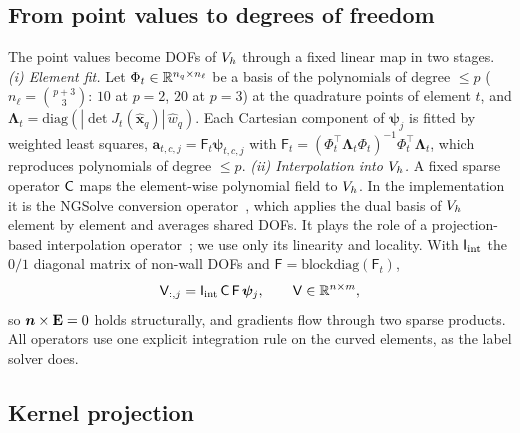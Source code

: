 \subsection{From point values to degrees of freedom}\label{sec:04-map}

The point values become DOFs of $V_h$ through a fixed linear map in two stages.
\emph{(i) Element fit.}
Let $\Phi_t\in\mathbb{R}^{n_q\times n_\ell}$ be a basis of the polynomials of degree $\le p$ ($n_\ell=\binom{p+3}{3}$: $10$ at $p=2$, $20$ at $p=3$) at the quadrature points of element $t$, and $\bm\Lambda_t=\mathrm{diag}(|\det J_t(\hat{\bm x}_q)|\,\hat w_q)$.
Each Cartesian component of $\bm\psi_j$ is fitted by weighted least squares, $\bm a_{t,c,j}=\mathsf F_t\bm\psi_{t,c,j}$ with $\mathsf F_t=(\Phi_t^{\!\top}\bm\Lambda_t\Phi_t)^{-1}\Phi_t^{\!\top}\bm\Lambda_t$, which reproduces polynomials of degree $\le p$.
\emph{(ii) Interpolation into $V_h$.}
A fixed sparse operator $\mathsf{C}$ maps the element-wise polynomial field to $V_h$.
In the implementation it is the NGSolve conversion operator~\cite{schoberl2014cpp11}, which applies the dual basis of $V_h$ element by element and averages shared DOFs.
It plays the role of a projection-based interpolation operator~\cite{demkowicz2005projection}; we use only its linearity and locality.
With $\mathsf I_{\rm int}$ the $0/1$ diagonal matrix of non-wall DOFs and $\mathsf F=\mathrm{blockdiag}(\mathsf F_t)$,
\begin{equation}\label{eq:04-V}
  \mathsf{V}_{:,j}=\mathsf I_{\rm int}\,\mathsf{C}\,\mathsf F\,\bm\psi_j,\qquad \mathsf{V}\in\mathbb{R}^{n\times m},
\end{equation}
so $\bm n\times\mathbf{E}=0$ holds structurally, and gradients flow through two sparse products.
All operators use one explicit integration rule on the curved elements, as the label solver does.

\subsection{Kernel projection}\label{sec:04-proj}

